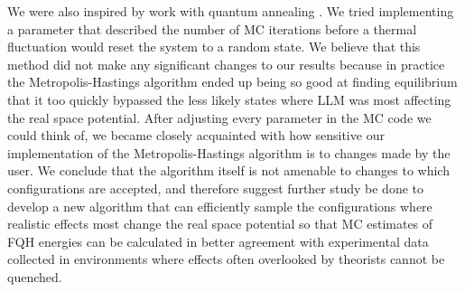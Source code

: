     We were also inspired by work with quantum annealing \cite{finnila}. We tried implementing a parameter that described the number of MC iterations before a thermal fluctuation would reset the system to a random state. We believe that this method did not make any significant changes to our results because in practice the Metropolis-Hastings algorithm ended up being so good at finding equilibrium that it too quickly bypassed the less likely states where LLM was most affecting the real space potential. After adjusting every parameter in the MC code we could think of, we became closely acquainted with how sensitive our implementation of the Metropolis-Hastings algorithm is to changes made by the user. We conclude that the algorithm itself is not amenable to changes to which configurations are accepted, and therefore suggest further study be done to develop a new algorithm that can efficiently sample the configurations where realistic effects most change the real space potential so that MC estimates of FQH energies can be calculated in better agreement with experimental data collected in environments where effects often overlooked by theorists cannot be quenched.

\singlespacing